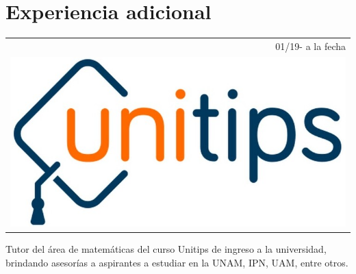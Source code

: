 \documentclass[]{friggeri-cv}
\begin{document}
\section{Experiencia adicional}
\begin{entrylist}
\entry
    {   \begin{tabular}{r}
    		01/19- a la fecha  \\
     		\includegraphics[scale=0.09]{img/unitips.jpg}
	\end{tabular}
    }
    {\vspace{-1.05cm}}
    { }
    {Tutor del área de matemáticas del curso Unitips de ingreso a la universidad, brindando asesorías a aspirantes a estudiar en la UNAM, IPN, UAM, entre otros.}
\end{entrylist}
    \newpage
\end{document}
